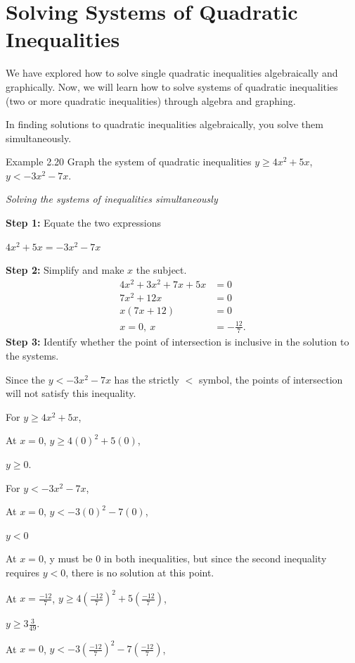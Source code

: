 \section{Solving Systems of Quadratic Inequalities}

We have explored how to solve single quadratic inequalities algebraically and
graphically. Now, we will learn how to solve systems of quadratic inequalities
(two or more quadratic inequalities) through algebra and graphing.

In finding solutions to quadratic inequalities algebraically, you solve them
simultaneously.

\begin{example}{Example 2.20}
Graph the system of quadratic inequalities $y \ge 4x^2 + 5x$, $y < -3x^2 - 7x$.

\solution
\textit{Solving the systems of inequalities simultaneously}

\textbf{Step 1:} Equate the two expressions

$4x^2 + 5x = -3x^2 - 7x$

\textbf{Step 2:} Simplify and make $x$ the subject.
\begin{align*}
  4x^2 + 3x^2 + 7x + 5x &= 0 \\
  7x^2 + 12x &= 0 \\
  x(7x + 12) &= 0 \\
  x = 0,\ x &= -\frac{12}{7}.
\end{align*}
\textbf{Step 3:} Identify whether the point of intersection is inclusive in the solution to
the systems.

Since the $y < -3x^2 - 7x$ has the strictly $<$ symbol, the points of intersection will
not satisfy this inequality.

For $y \ge 4x^2 + 5x$,

At $x = 0$, $y \ge 4(0)^2 + 5(0)$,

$y \ge 0$.

For $y < -3x^2 - 7x$,

At $x = 0$, $y < -3(0)^2 - 7(0)$,

$y < 0$

At $x = 0$, y must be 0 in both inequalities, but since the second inequality requires
$y < 0$, there is no solution at this point.

At $x = \frac{-12}{7}$, $y \ge 4\left(\frac{-12}{7}\right)^2 + 5\left(\frac{-12}{7}\right)$,

$y \ge 3\frac{3}{49}$.

At $x = 0$, $y < -3\left(\frac{-12}{7}\right)^2 - 7\left(\frac{-12}{7}\right)$,


\end{example}
